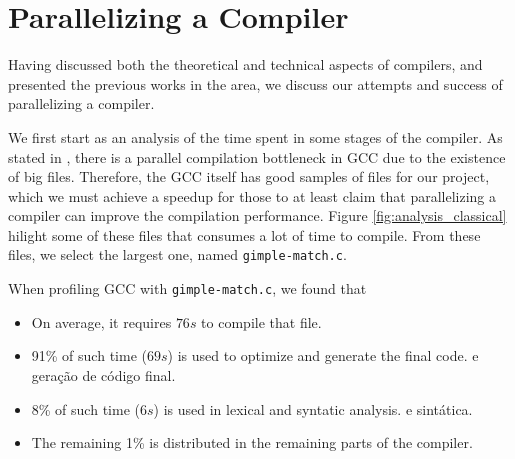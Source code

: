 \chapter{Parallelizing a Compiler}
\label{chap:proposta}

Having discussed both the theoretical and technical aspects of compilers, and
presented the previous works in the area, we discuss our attempts and success
of parallelizing a compiler.



We first start as an analysis of the time spent in some stages of the compiler.
As stated in \cite{PR84402}, there is a parallel compilation bottleneck in GCC
due to the existence of big files. Therefore, the GCC itself has good samples
of files for our project, which we must achieve a speedup for those to at least
claim that parallelizing a compiler can improve the compilation performance.
Figure \ref{fig:analysis_classical} hilight some of these files that consumes a
lot of time to compile. From these files, we select the largest one, named
\texttt{gimple-match.c}.

When profiling GCC with \texttt{gimple-match.c}, we found that
\begin{itemize}
    \item On average, it requires $76s$ to compile that file.

    \item 91\% of such time ($69s$) is used to optimize and generate the final code.
        e geração de código final.

    \item 8\% of such time ($6s$) is used in lexical and syntatic analysis.
        e sintática.

    \item The remaining 1\% is distributed in the remaining parts of the compiler.
\end{itemize}


